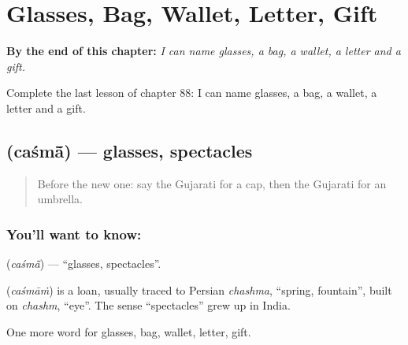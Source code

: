 
\chapter{Glasses, Bag, Wallet, Letter, Gift}
\label{ch:gu-glasses-bag-wallet-letter-gift}

\begin{chapteropening}
\textbf{By the end of this chapter:} \emph{I can name glasses, a bag, a wallet, a letter and a gift.}

Complete the last lesson of chapter 88: I can name glasses, a bag, a wallet, a letter and a gift.
\end{chapteropening}

\section[\texorpdfstring{\gu{ચશ્માં} (caśmā̃)}{ચશ્માં (caśmā̃)}]{ (caśmā̃) — glasses, spectacles}

\label{lesson:GU-C88-glasses}



\begin{quote}
Before the new one: say the Gujarati for a cap, then the Gujarati for an umbrella.
\end{quote}

\subsection*{You'll want to know: }
\textbf{} (\emph{caśmā̃}) — \textquotedblleft{}glasses, spectacles\textquotedblright{}.

\begin{cousinweb}
\textbf{} (\emph{caśmāṁ}) is a loan, usually traced to Persian \emph{chashma}, \textquotedblleft{}spring, fountain\textquotedblright{}, built on \emph{chashm}, \textquotedblleft{}eye\textquotedblright{}. The sense \textquotedblleft{}spectacles\textquotedblright{} grew up in India.
\end{cousinweb}

\begin{grammarlens}[title={What you've built}]
One more word for glasses, bag, wallet, letter, gift.
\end{grammarlens}

